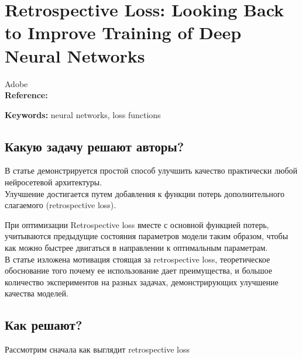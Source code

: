 \chapter{Retrospective Loss: Looking Back to Improve Training of Deep Neural Networks}

Adobe \\

\textbf{Reference:}~\cite{jandial2020retrospective}

\textbf{Keywords:} neural networks, loss functions

\section{Какую задачу решают авторы?}

В статье демонстрируется простой способ улучшить качество практически любой нейросетевой архитектуры. \\

Улучшение достигается путем добавления к функции потерь дополнительного слагаемого (retrospective loss).

При оптимизации Retrospective loss вместе с основной функцией потерь, учитываются предыдущие состояния параметров модели таким образом, чтобы как можно быстрее двигаться в направлении к оптимальным параметрам. \\

В статье изложена мотивация стоящая за retrospective loss, теоретическое обоснование того почему ее использование дает преимущества, и большое количество экспериментов на разных задачах, демонстрирующих улучшение качества моделей. 

\section{Как решают?}

Рассмотрим сначала как выглядит retrospective loss


